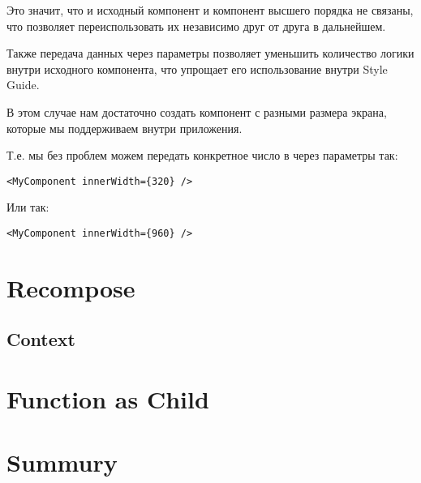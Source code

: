 Это значит, что и исходный компонент и компонент высшего порядка не связаны, что позволяет переиспользовать их независимо друг от друга в дальнейшем.

Также передача данных через параметры позволяет уменьшить количество логики внутри исходного компонента, что упрощает его использование внутри Style Guide. 

В этом случае нам достаточно создать компонент с разными размера экрана, которые мы поддерживаем внутри приложения.

Т.е. мы без проблем можем передать конкретное число в через параметры так:

\begin{lstlisting}
<MyComponent innerWidth={320} />	
\end{lstlisting}

Или так:

\begin{lstlisting}
<MyComponent innerWidth={960} />	
\end{lstlisting}


\section{Recompose}



\subsection{Context}

\section{Function as Child}

\section{Summury}



















